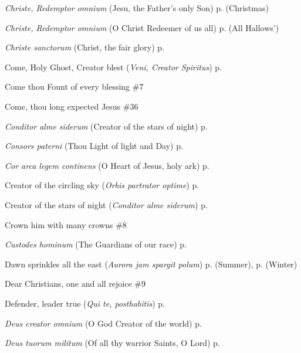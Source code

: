 \begin{hangparas}{1.25em}{1}
\par\noindent
\textit{Christe, Redemptor omnium} (Jesu, the Father's only Son) \dotfill p. \pageref{ChristmasEvensong} (Christmas)
\par\noindent
\textit{Christe, Redemptor omnium} (O Christ Redeemer of us all) \dotfill p. \pageref{AllHallowsEvensong} (All Hallows')
\par\noindent
\textit{Christe sanctorum} (Christ, the fair glory) \dotfill p. \pageref{MichaelMattins}
\par\noindent
Come, Holy Ghost, Creator blest (\textit{Veni, Creator Spiritus}) \dotfill p. \pageref{WhitsundayEvensong}
\par\noindent
Come thou Fount of every blessing \dotfill \#7
\par\noindent
Come, thou long expected Jesus \dotfill \#36
\par\noindent
\textit{Conditor alme siderum} (Creator of the stars of night) \dotfill p. \pageref{FirstAdventEvensong}
\par\noindent
\textit{Consors paterni} (Thou Light of light and Day) \dotfill p. \pageref{TuesdayInvitatory}
\par\noindent
\textit{Cor arca legem continens} (O Heart of Jesus, holy ark) \dotfill p. \pageref{CompassionMattins}
\par\noindent
Creator of the circling sky (\textit{Orbis partrator optime}) \dotfill p. \pageref{GuardianAngelsMattins}
\par\noindent
Creator of the stars of night (\textit{Conditor alme siderum}) \dotfill p. \pageref{FirstAdventEvensong}
\par\noindent
Crown him with many crowns \dotfill \#8
\par\noindent
\textit{Custodes hominum} (The Guardians of our race) \dotfill p. \pageref{GuardianAngelsEvensong}
\par\noindent
Dawn sprinkles all the east (\textit{Aurora jam spargit polum}) \dotfill p. \pageref{SaturdayMattinsSummer} (Summer), p. \pageref{SaturdayMattinsWinter} (Winter)
\par\noindent
Dear Christians, one and all rejoice \dotfill \#9
\par\noindent
Defender, leader true (\textit{Qui te, posthabitis}) \dotfill p. \pageref{MaurusEvensong}
\par\noindent
\textit{Deus creator omnium} (O God Creator of the world) \dotfill p. \pageref{WeekdayInvitatory}
\par\noindent
\textit{Deus tuorum militum} (Of all thy warrior Saints, O Lord) \dotfill p. \pageref{StephenEvensong}

\end{hangparas}
